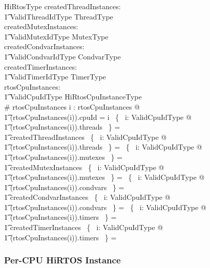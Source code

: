 \documentclass[11pt,letterpaper,twoside,openany]{book}
\begin{document}
\begin{schema}{HiRtosType}
    createdThreadInstances: \\
    \t1 ValidThreadIdType \finj ThreadType \\
    createdMutexInstances: \\
    \t1 ValidMutexIdType \finj MutexType \\
    createdCondvarInstances: \\
    \t1 ValidCondvarIdType \finj CondvarType \\
    createdTimerInstances: \\
    \t1 ValidTimerIdType \finj TimerType \\
    rtosCpuInstances: \\
    \t1 ValidCpuIdType \finj HiRtosCpuInstanceType \\
\where
    \# rtosCpuInstances 
\also
    \forall i : \dom rtosCpuInstances @ \\
\t1   (rtosCpuInstances(i)).cpuId = i
\also
    \bigcup~\{~ i: ValidCpuIdType @ \\
\t1    (rtosCpuInstances(i)).threads ~\} = \\
\t1    createdThreadInstances
\also
    \bigcap~\{~ i: ValidCpuIdType @ \\
\t1    (rtosCpuInstances(i)).threads ~\} = \emptyset
\also
    \bigcup~\{~ i: ValidCpuIdType @ \\
\t1    (rtosCpuInstances(i)).mutexes ~\} = \\
\t1    createdMutexInstances
\also
    \bigcap~\{~ i: ValidCpuIdType @ \\
\t1    (rtosCpuInstances(i)).mutexes ~\} = \emptyset
\also
    \bigcup~\{~ i: ValidCpuIdType @ \\
\t1    (rtosCpuInstances(i)).condvars ~\} = \\
\t1    createdCondvarInstances
\also
    \bigcap~\{~ i: ValidCpuIdType @ \\
\t1    (rtosCpuInstances(i)).condvars ~\} = \emptyset
\also
    \bigcup~\{~ i: ValidCpuIdType @ \\
\t1    (rtosCpuInstances(i)).timers ~\} = \\
\t1    createdTimerInstances
\also
    \bigcap~\{~ i: ValidCpuIdType @ \\
\t1    (rtosCpuInstances(i)).timers ~\} = \emptyset
\end{schema}

\subsubsection{Per-CPU HiRTOS Instance}
\end{document}
